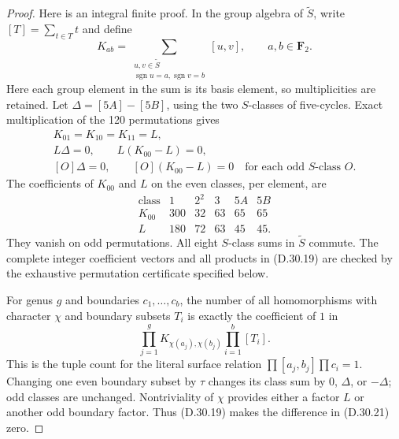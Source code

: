 \begin{proof}
Here is an integral finite proof.  In the group
algebra of $\widetilde S$, write $[T]=\sum_{t\in T}t$
and define
\[
 K_{ab}=\sum_{\substack{u,v\in\widetilde S\\
                 \operatorname{sgn}u=a,\operatorname{sgn}v=b}}
                       [u,v],
 \qquad a,b\in\mathbf F_2.
 \tag{D.30.18}
\]
Here each group element in the sum is its basis
element, so multiplicities are retained.
Let $\Delta=[5A]-[5B]$, using the two $S$-classes
of five-cycles.  Exact multiplication of the
120 permutations gives
\[
 \begin{gathered}
 K_{01}=K_{10}=K_{11}=L,\\
 L\Delta=0,\qquad L(K_{00}-L)=0,\\
 [O]\Delta=0,\qquad [O](K_{00}-L)=0
       \quad\text{for each odd }S\text{-class }O.
 \end{gathered}
 \tag{D.30.19}
\]
The coefficients of $K_{00}$ and $L$ on the
even classes, per element, are
\[
 \begin{array}{c|rrrrr}
 \text{class}&1&2^2&3&5A&5B\\\hline
 K_{00}&300&32&63&65&65\\
 L&180&72&63&45&45.
 \end{array}
 \tag{D.30.20}
\]
They vanish on odd permutations.  All eight
$S$-class sums in $\widetilde S$ commute.
The complete integer coefficient vectors and
all products in \textup{(D.30.19)} are checked
by the exhaustive permutation certificate
specified below.

For genus $g$ and boundaries $c_1,\ldots,c_b$,
the number of all homomorphisms with character
$\chi$ and boundary subsets $T_i$ is exactly
the coefficient of $1$ in
\[
 \prod_{j=1}^g K_{\chi(a_j),\chi(b_j)}
                   \prod_{i=1}^b[T_i].
 \tag{D.30.21}
\]
This is the tuple count for the literal surface
relation $\prod[a_j,b_j]\prod c_i=1$.
Changing one even boundary subset by $\tau$
changes its class sum by $0$, $\Delta$, or
$-\Delta$; odd classes are unchanged.
Nontriviality of $\chi$ provides either a
factor $L$ or another odd boundary factor.
Thus \textup{(D.30.19)} makes the difference
in \textup{(D.30.21)} zero.


\end{proof}
